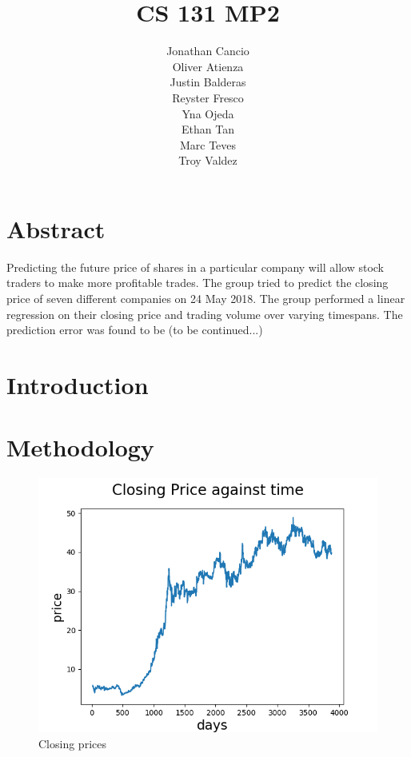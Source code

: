 \documentclass[8pt]{article}
\begin{document}
	\author{Jonathan Cancio \\ Oliver Atienza \\ Justin Balderas \\ 
	Reyster Fresco \\ Yna Ojeda \\ Ethan Tan \\ Marc Teves \\ Troy Valdez}
	\title{CS 131 MP2}
	\maketitle
	\section{Abstract}
	Predicting the future price of shares in a particular company will allow stock traders to make more profitable trades.
	The group tried to predict the closing price of seven different companies on 24 May 2018. 
	The group performed a linear regression on their closing price and trading volume over varying timespans.
	The prediction error was found to be (to be continued...)
	\section{Introduction}

	\section{Methodology}

	\begin{figure}[h]
		\centering
		\includegraphics{ap_closing_price.png}
		\caption{Closing prices}
		\label{fig:close_price_graph}
	\end{figure}
\end{document}
